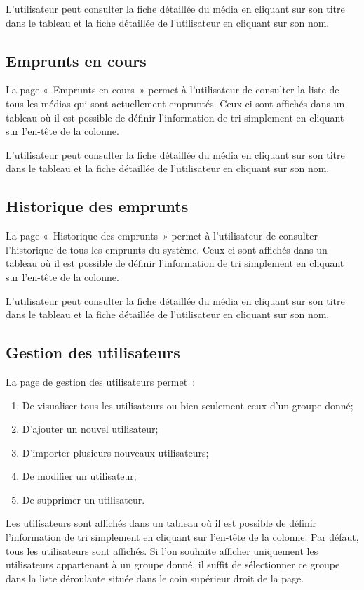 \documentclass[letter, 11pt]{report}
\begin{document}
L'utilisateur peut consulter la fiche détaillée du média en cliquant sur son titre dans le tableau et la fiche détaillée de l'utilisateur en cliquant sur son nom.

\subsection{Emprunts en cours}
La page «~Emprunts en cours~» permet à l'utilisateur de consulter la liste de tous les médias qui sont actuellement empruntés. Ceux-ci sont affichés dans un tableau où il est possible de définir l'information de tri simplement en cliquant sur l'en-tête de la colonne.

L'utilisateur peut consulter la fiche détaillée du média en cliquant sur son titre dans le tableau et la fiche détaillée de l'utilisateur en cliquant sur son nom.

\subsection{Historique des emprunts}
La page «~Historique des emprunts~» permet à l'utilisateur de consulter l'historique de tous les emprunts du système. Ceux-ci sont affichés dans un tableau où il est possible de définir l'information de tri simplement en cliquant sur l'en-tête de la colonne.

L'utilisateur peut consulter la fiche détaillée du média en cliquant sur son titre dans le tableau et la fiche détaillée de l'utilisateur en cliquant sur son nom.

\subsection{Gestion des utilisateurs}
La page de gestion des utilisateurs permet~:
\begin{enumerate}
	\item De visualiser tous les utilisateurs ou bien seulement ceux d'un groupe donné;
	\item D'ajouter un nouvel utilisateur;
	\item D'importer plusieurs nouveaux utilisateurs;
	\item De modifier un utilisateur;
	\item De supprimer un utilisateur.
\end{enumerate}

Les utilisateurs sont affichés dans un tableau où il est possible de définir l'information de tri simplement en cliquant sur l'en-tête de la colonne. Par défaut, tous les utilisateurs sont affichés. Si l'on souhaite afficher uniquement les utilisateurs appartenant à un groupe donné, il suffit de sélectionner ce groupe dans la liste déroulante située dans le coin supérieur droit de la page.
\end{document}
